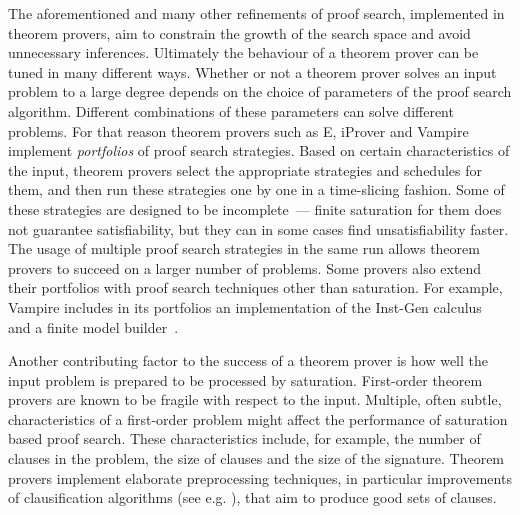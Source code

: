 

The aforementioned and many other refinements of proof search, implemented in theorem provers, aim to constrain the growth of the search space and avoid unnecessary inferences. Ultimately the behaviour of a theorem prover can be tuned in many different ways. Whether or not a theorem prover solves an input problem to a large degree depends on the choice of parameters of the proof search algorithm. Different combinations of these parameters can solve different problems. For that reason theorem provers such as E, iProver and Vampire implement \emph{portfolios} of proof search strategies. Based on certain characteristics of the input, theorem provers select the appropriate strategies and schedules for them, and then run these strategies one by one in a time-slicing fashion. Some of these strategies are designed to be incomplete~--- finite saturation for them does not guarantee satisfiability, but they can in some cases find unsatisfiability faster. The usage of multiple proof search strategies in the same run allows theorem provers to succeed on a larger number of problems. Some provers also extend their portfolios with proof search techniques other than saturation. For example, Vampire includes in its portfolios an implementation of the Inst-Gen calculus~\cite{DBLP:conf/birthday/Korovin13} and a finite model builder~\cite{VampireFMB}.

Another contributing factor to the success of a theorem prover is how well the input problem is prepared to be processed by saturation. First-order theorem provers are known to be fragile with respect to the input. Multiple, often subtle, characteristics of a first-order problem might affect the performance of saturation based proof search. These characteristics include, for example, the number of clauses in the problem, the size of clauses and the size of the signature. Theorem provers implement elaborate preprocessing techniques, in particular improvements of clausification algorithms (see e.g. \cite{nonnengart2001computing,azmy2013computing,newcnf_fol}), that aim to produce good sets of clauses.

